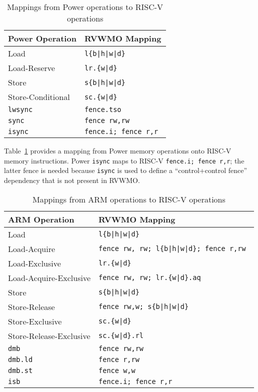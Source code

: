 \begin{table}[h!]
  \centering
  \begin{tabular}{|l|l|}
    \hline
    Power Operation & RVWMO Mapping \\
    \hline
    \hline
    Load              & \tt l\{b|h|w|d\}  \\
    \hline
    Load-Reserve      & \tt lr.\{w|d\}  \\
    \hline
    Store             & \tt s\{b|h|w|d\}  \\
    \hline
    Store-Conditional & \tt sc.\{w|d\}  \\
    \hline
    \tt lwsync        & \tt fence.tso \\
    \hline
    \tt sync          & \tt fence rw,rw \\
    \hline
    \tt isync         & \tt fence.i; fence r,r \\
    \hline
  \end{tabular}
  \caption{Mappings from Power operations to RISC-V operations}
  \label{tab:powermappings}
\end{table}

Table~\ref{tab:powermappings} provides a mapping from Power memory operations onto RISC-V memory instructions.
Power {\tt isync} maps to RISC-V {\tt fence.i; fence r,r}; the latter fence is needed because {\tt isync} is used to define a ``control+control fence'' dependency that is not present in RVWMO.

\begin{table}[h!]
  \centering
  \begin{tabular}{|l|l|}
    \hline
    ARM Operation             & RVWMO Mapping \\
    \hline
    \hline
    Load                      & \tt l\{b|h|w|d\}  \\
    \hline
    Load-Acquire              & \tt fence rw, rw; l\{b|h|w|d\}; fence r,rw  \\
    \hline
    Load-Exclusive            & \tt lr.\{w|d\}  \\
    \hline
    Load-Acquire-Exclusive    & \tt fence rw, rw; lr.\{w|d\}.aq \\
    \hline
    Store                     & \tt s\{b|h|w|d\}  \\
    \hline
    Store-Release             & \tt fence rw,w; s\{b|h|w|d\}  \\
    \hline
    Store-Exclusive           & \tt sc.\{w|d\}  \\
    \hline
    Store-Release-Exclusive   & \tt sc.\{w|d\}.rl  \\
    \hline
    \tt dmb                   & \tt fence rw,rw \\
    \hline
    \tt dmb.ld                & \tt fence r,rw \\
    \hline
    \tt dmb.st                & \tt fence w,w \\
    \hline
    \tt isb                   & \tt fence.i; fence r,r \\
    \hline
  \end{tabular}
  \caption{Mappings from ARM operations to RISC-V operations}
  \label{tab:armmappings}
\end{table}


